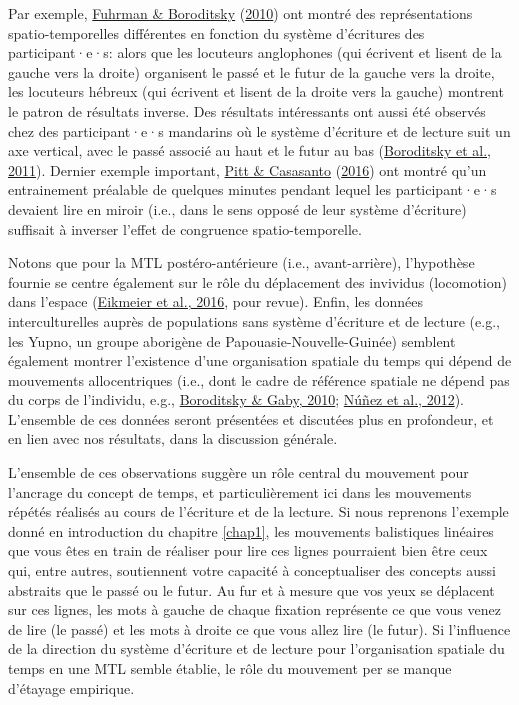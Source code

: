 \documentclass[
  a4paper,12pt,twoside,onecolumn,openright,final,oldfontcommands]{memoir}
\begin{document}
Par exemple, \protect\hyperlink{ref-fuhrman_cross-cultural_2010}{Fuhrman \& Boroditsky} (\protect\hyperlink{ref-fuhrman_cross-cultural_2010}{2010}) ont montré des représentations spatio-temporelles différentes en fonction du système d'écritures des participant·e·s: alors que les locuteurs anglophones (qui écrivent et lisent de la gauche vers la droite) organisent le passé et le futur de la gauche vers la droite, les locuteurs hébreux (qui écrivent et lisent de la droite vers la gauche) montrent le patron de résultats inverse. Des résultats intéressants ont aussi été observés chez des participant·e·s mandarins où le système d'écriture et de lecture suit un axe vertical, avec le passé associé au haut et le futur au bas (\protect\hyperlink{ref-boroditsky_english_2011}{Boroditsky et al., 2011}). Dernier exemple important, \protect\hyperlink{ref-pitt_reading_2016}{Pitt \& Casasanto} (\protect\hyperlink{ref-pitt_reading_2016}{2016}) ont montré qu'un entrainement préalable de quelques minutes pendant lequel les participant·e·s devaient lire en miroir (i.e., dans le sens opposé de leur système d'écriture) suffisait à inverser l'effet de congruence spatio-temporelle.

Notons que pour la MTL postéro-antérieure (i.e., avant-arrière), l'hypothèse fournie se centre également sur le rôle du déplacement des invividus (locomotion) dans l'espace (\protect\hyperlink{ref-lewandowska-tomaszczyk_mental_2016}{Eikmeier et al., 2016}, pour revue). Enfin, les données interculturelles auprès de populations sans système d'écriture et de lecture (e.g., les Yupno, un groupe aborigène de Papouasie-Nouvelle-Guinée) semblent également montrer l'existence d'une organisation spatiale du temps qui dépend de mouvements allocentriques (i.e., dont le cadre de référence spatiale ne dépend pas du corps de l'individu, e.g., \protect\hyperlink{ref-boroditsky_remembrances_2010}{Boroditsky \& Gaby, 2010}; \protect\hyperlink{ref-nunez_contours_2012}{Núñez et al., 2012}). L'ensemble de ces données seront présentées et discutées plus en profondeur, et en lien avec nos résultats, dans la discussion générale.

L'ensemble de ces observations suggère un rôle central du mouvement pour l'ancrage du concept de temps, et particulièrement ici dans les mouvements répétés réalisés au cours de l'écriture et de la lecture. Si nous reprenons l'exemple donné en introduction du chapitre \ref{chap1}, les mouvements balistiques linéaires que vous êtes en train de réaliser pour lire ces lignes pourraient bien être ceux qui, entre autres, soutiennent votre capacité à conceptualiser des concepts aussi abstraits que le passé ou le futur. Au fur et à mesure que vos yeux se déplacent sur ces lignes, les mots à gauche de chaque fixation représente ce que vous venez de lire (le passé) et les mots à droite ce que vous allez lire (le futur). Si l'influence de la direction du système d'écriture et de lecture pour l'organisation spatiale du temps en une MTL semble établie, le rôle du mouvement per se manque d'étayage empirique.
\end{document}
